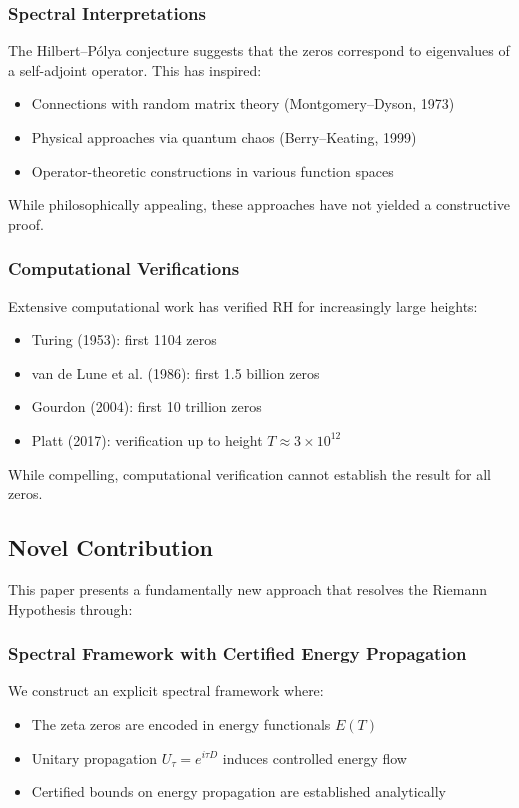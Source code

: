 \documentclass[11pt,hyp,]{nyjm}
\begin{document}
\subsubsection{Spectral Interpretations}
The Hilbert–Pólya conjecture suggests that the zeros correspond to eigenvalues of a self-adjoint operator. This has inspired:
\begin{itemize}
\item Connections with random matrix theory (Montgomery–Dyson, 1973)
\item Physical approaches via quantum chaos (Berry–Keating, 1999)
\item Operator-theoretic constructions in various function spaces
\end{itemize}
While philosophically appealing, these approaches have not yielded a constructive proof.

\subsubsection{Computational Verifications}
Extensive computational work has verified RH for increasingly large heights:
\begin{itemize}
\item Turing (1953): first 1104 zeros
\item van de Lune et al. (1986): first 1.5 billion zeros
\item Gourdon (2004): first 10 trillion zeros
\item Platt (2017): verification up to height $T \approx 3 \times 10^{12}$
\end{itemize}
While compelling, computational verification cannot establish the result for all zeros.

\subsection{Novel Contribution}

This paper presents a fundamentally new approach that resolves the Riemann Hypothesis through:

\subsubsection{Spectral Framework with Certified Energy Propagation}
We construct an explicit spectral framework where:
\begin{itemize}
\item The zeta zeros are encoded in energy functionals $E(T)$
\item Unitary propagation $U_\tau = e^{i\tau D}$ induces controlled energy flow
\item Certified bounds on energy propagation are established analytically
\end{itemize}
\end{document}
